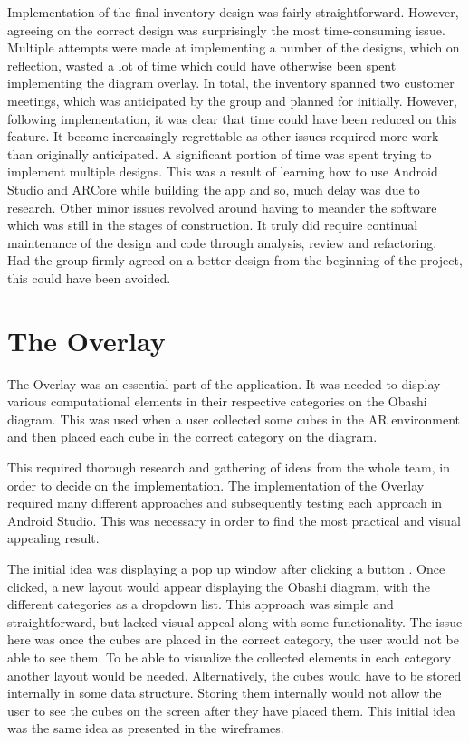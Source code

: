\documentclass{l3proj}
\begin{document}
Implementation of the final inventory design was fairly straightforward. However, agreeing on the 
correct design was surprisingly the most time-consuming issue. Multiple attempts were made at 
implementing a number of the designs, which on reflection, wasted a lot of time which could have 
otherwise been spent implementing the diagram overlay. In total, the inventory spanned two customer 
meetings, which was anticipated by the group and planned for initially.  However, following 
implementation, it was clear that time could have been reduced on this feature. It became increasingly 
regrettable as other issues required more work than originally anticipated. A significant portion 
of time was spent trying to implement multiple designs. This was a result of learning how to use 
Android Studio and ARCore while building the app and so, much delay was due to research. Other minor 
issues revolved around having to meander the software which was still in the stages of construction.  
It truly did require continual maintenance of the design and code through analysis, review and 
refactoring.  Had the group firmly agreed on a better design from the beginning of the project, 
this could have been avoided.  



\section{The Overlay}

The Overlay was an essential part of the application. It was needed to display
various computational elements in their respective categories on the Obashi diagram. 
This was used when a user collected some cubes in the AR environment and then placed 
each cube in the correct category on the diagram.

This required thorough research and gathering of ideas from the whole team, in order 
to decide on the implementation. The implementation of the Overlay required many different
approaches and subsequently testing each approach in Android Studio. This was necessary in order 
to find the most practical and visual appealing result. 

The initial idea was displaying a pop up window after clicking a button \cite{PopUpWindow}.
Once clicked, a new layout would appear displaying the Obashi diagram, with the
different categories as a dropdown list\cite{DropList}. This approach was simple and 
straightforward, but lacked visual appeal along with some functionality. The issue here 
was once the cubes are placed in the correct category, the user would not be able to see them. 
To be able to visualize the collected elements in each category another layout would be needed.
Alternatively, the cubes would have to be stored internally in some data structure. Storing 
them internally would not allow the user to see the cubes on the screen after they have placed
them. This initial idea was the same idea as presented in the wireframes.
\end{document}
